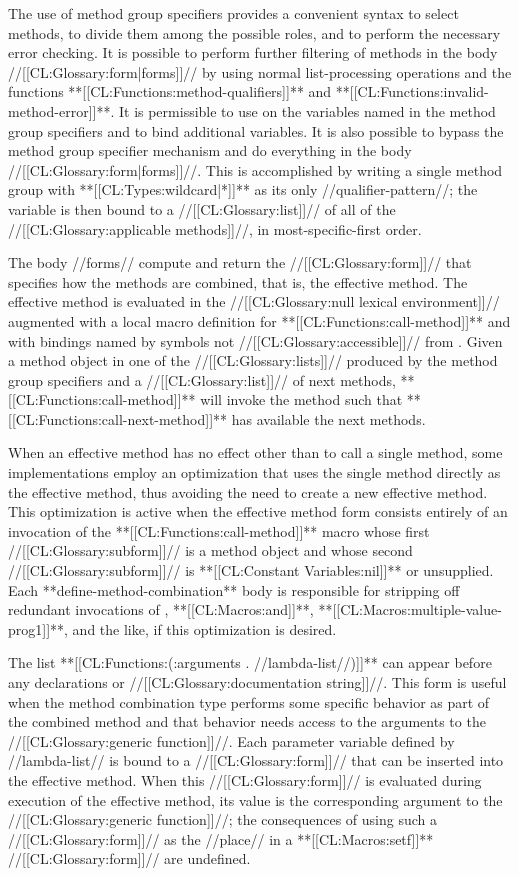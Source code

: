The use of method group specifiers provides a convenient syntax to select methods, to divide them among the possible roles, and to perform the necessary error checking. It is possible to perform further filtering of methods in the body //[[CL:Glossary:form|forms]]// by using normal list-processing operations and the functions **[[CL:Functions:method-qualifiers]]** and **[[CL:Functions:invalid-method-error]]**. It is permissible to use  on the variables named in the method group specifiers and to bind additional variables. It is also possible to bypass the method group specifier mechanism and do everything in the body //[[CL:Glossary:form|forms]]//. This is accomplished by writing a single method group with **[[CL:Types:wildcard|*]]** as its only //qualifier-pattern//; the variable is then bound to a //[[CL:Glossary:list]]// of all of the //[[CL:Glossary:applicable methods]]//, in most-specific-first order.

The body //forms// compute and return the //[[CL:Glossary:form]]// that specifies how the methods are combined, that is, the effective method. The effective method is evaluated in the //[[CL:Glossary:null lexical environment]]// augmented with a local macro definition for **[[CL:Functions:call-method]]** and with bindings named by symbols not //[[CL:Glossary:accessible]]// from . Given a method object in one of the //[[CL:Glossary:lists]]// produced by the method group specifiers and a //[[CL:Glossary:list]]// of next methods, **[[CL:Functions:call-method]]** will invoke the method such that **[[CL:Functions:call-next-method]]** has available the next methods.

When an effective method has no effect other than to call a single method, some implementations employ an optimization that uses the single method directly as the effective method, thus avoiding the need to create a new effective method. This optimization is active when the effective method form consists entirely of an invocation of the **[[CL:Functions:call-method]]** macro whose first //[[CL:Glossary:subform]]// is a method object and whose second //[[CL:Glossary:subform]]// is **[[CL:Constant Variables:nil]]** or unsupplied. Each **define-method-combination** body is responsible for stripping off redundant invocations of , **[[CL:Macros:and]]**, **[[CL:Macros:multiple-value-prog1]]**, and the like, if this optimization is desired.

The list **[[CL:Functions:(:arguments . //lambda-list//)]]** can appear before any declarations or //[[CL:Glossary:documentation string]]//. This form is useful when the method combination type performs some specific behavior as part of the combined method and that behavior needs access to the arguments to the //[[CL:Glossary:generic function]]//. Each parameter variable defined by //lambda-list// is bound to a //[[CL:Glossary:form]]// that can be inserted into the effective method. When this //[[CL:Glossary:form]]// is evaluated during execution of the effective method, its value is the corresponding argument to the //[[CL:Glossary:generic function]]//; the consequences of using such a //[[CL:Glossary:form]]// as the //place// in a **[[CL:Macros:setf]]** //[[CL:Glossary:form]]// are undefined.

